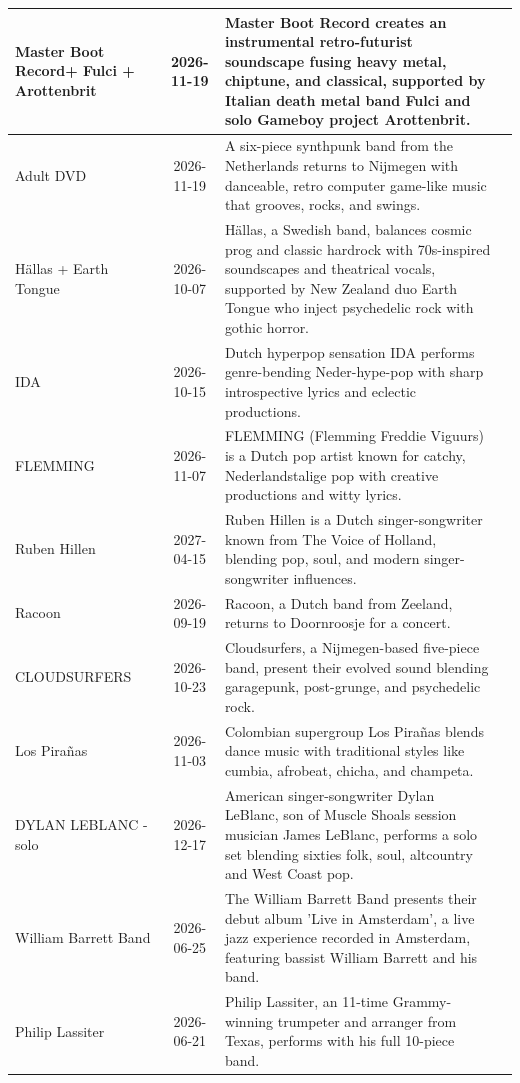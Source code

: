 \begin{center}
\begin{longtable}{p{3cm}cp{7cm}p{3cm}}
\midrule
Master Boot Record+ Fulci + Arottenbrit & 2026-11-19 & Master Boot Record creates an instrumental retro-futurist soundscape fusing heavy metal, chiptune, and classical, supported by Italian death metal band Fulci and solo Gameboy project Arottenbrit. \\
\midrule
Adult DVD & 2026-11-19 & A six-piece synthpunk band from the Netherlands returns to Nijmegen with danceable, retro computer game-like music that grooves, rocks, and swings. \\
\midrule
Hällas + Earth Tongue & 2026-10-07 & Hällas, a Swedish band, balances cosmic prog and classic hardrock with 70s-inspired soundscapes and theatrical vocals, supported by New Zealand duo Earth Tongue who inject psychedelic rock with gothic horror. \\
\midrule
IDA & 2026-10-15 & Dutch hyperpop sensation IDA performs genre-bending Neder-hype-pop with sharp introspective lyrics and eclectic productions. \\
\midrule
FLEMMING & 2026-11-07 & FLEMMING (Flemming Freddie Viguurs) is a Dutch pop artist known for catchy, Nederlandstalige pop with creative productions and witty lyrics. \\
\midrule
Ruben Hillen & 2027-04-15 & Ruben Hillen is a Dutch singer-songwriter known from The Voice of Holland, blending pop, soul, and modern singer-songwriter influences. \\
\midrule
Racoon & 2026-09-19 & Racoon, a Dutch band from Zeeland, returns to Doornroosje for a concert. \\
\midrule
CLOUDSURFERS & 2026-10-23 & Cloudsurfers, a Nijmegen-based five-piece band, present their evolved sound blending garagepunk, post-grunge, and psychedelic rock. \\
\midrule
Los Pirañas & 2026-11-03 & Colombian supergroup Los Pirañas blends dance music with traditional styles like cumbia, afrobeat, chicha, and champeta. \\
\midrule
DYLAN LEBLANC - solo & 2026-12-17 & American singer-songwriter Dylan LeBlanc, son of Muscle Shoals session musician James LeBlanc, performs a solo set blending sixties folk, soul, altcountry and West Coast pop. \\
\midrule
William Barrett Band & 2026-06-25 & The William Barrett Band presents their debut album 'Live in Amsterdam', a live jazz experience recorded in Amsterdam, featuring bassist William Barrett and his band. \\
\midrule
Philip Lassiter & 2026-06-21 & Philip Lassiter, an 11-time Grammy-winning trumpeter and arranger from Texas, performs with his full 10-piece band. \\

\end{longtable}
\end{center}
